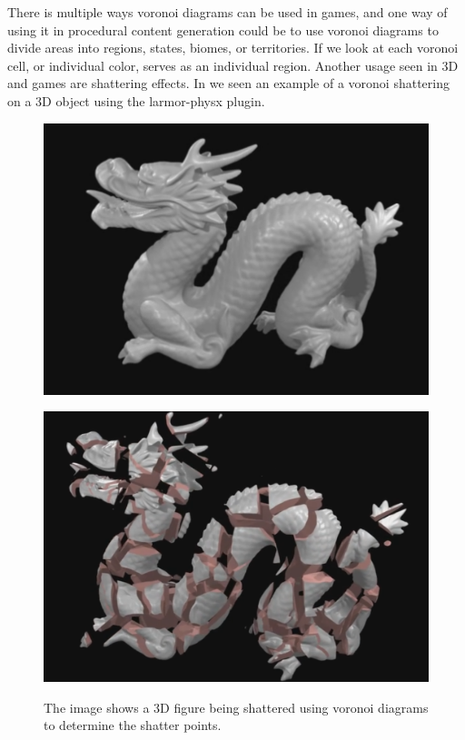 There is multiple ways voronoi diagrams can be used in games, and one way of using it in procedural content generation could be to use voronoi diagrams to divide areas into regions, states, biomes, or territories. If we look at  each voronoi cell, or individual color, serves as an individual region. Another usage seen in 3D and games are shattering effects. In  we seen an example of a voronoi shattering on a 3D object using the larmor-physx\cite{larmor-physx} plugin.

\begin{figure}[H]
	\begin{minipage}[b]{.49\linewidth}
		\includegraphics[width=0.95\linewidth]{img/VoronoiShatter1}
		\label{fig:3a}
	\end{minipage}
	\begin{minipage}[b]{.49\linewidth}
		\includegraphics[width=0.95\linewidth]{img/VoronoiShatter2}
		\label{fig:3b}
	\end{minipage}
	\centering
	\caption{The image shows a 3D figure being shattered using voronoi diagrams to determine the shatter points.}
	\label{fig:VoronoiShatering}
\end{figure}


